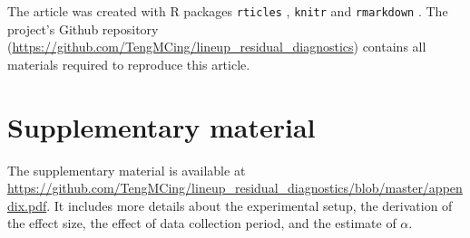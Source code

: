 \documentclass[]{interact}
\theoremstyle{plain}%
\theoremstyle{definition}
\theoremstyle{remark}
\begin{document}
The article was created with R packages \texttt{rticles}
\citep{rticles}, \texttt{knitr} \citep{knitr} and \texttt{rmarkdown}
\citep{rmarkdown}. The project's Github repository
(\url{https://github.com/TengMCing/lineup_residual_diagnostics})
contains all materials required to reproduce this article.

\hypertarget{supplementary-material}{%
\section*{Supplementary material}\label{supplementary-material}}

The supplementary material is available at
\url{https://github.com/TengMCing/lineup_residual_diagnostics/blob/master/appendix.pdf}.
It includes more details about the experimental setup, the derivation of
the effect size, the effect of data collection period, and the estimate
of \(\alpha\).



\end{document}
